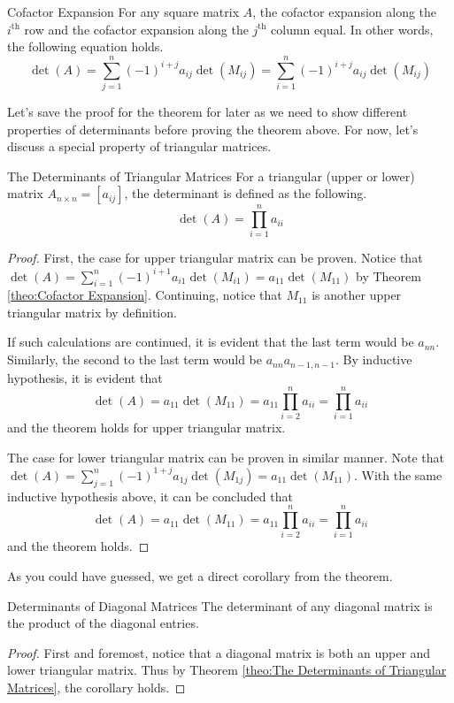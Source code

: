 \documentclass[../../main.tex]{subfiles}
\begin{document}
\begin{theorem}{}{Cofactor Expansion}
For any square matrix $A$, the cofactor expansion along the
$i^\text{th}$ row and the cofactor expansion along the $j^\text{th}$
column equal. In other words, the following equation holds.
\[
\det(A)
= \sum_{j=1}^n (-1)^{i + j} a_{ij} \det(M_{ij})
= \sum_{i=1}^n (-1)^{i + j} a_{ij} \det(M_{ij})
\]
\end{theorem}

Let's save the proof for the theorem for later as we need to show
different properties of determinants before proving the theorem
above. For now, let's discuss a special property of triangular
matrices.

\begin{theorem}{}{The Determinants of Triangular Matrices}
For a triangular (upper or lower) matrix $A_{n \times n} = [a_{ij}]$,
the determinant is defined as the following.
\[
\det(A)
= \prod_{i=1}^n a_{ii}
\]
\end{theorem}
\begin{proof}
First, the case for upper triangular matrix can be proven. Notice that
$\det(A) = \sum_{i=1}^n (-1)^{i + 1} a_{i1} \det(M_{i1}) =
a_{11} \det(M_{11})$ by Theorem \ref{theo:Cofactor Expansion}.
Continuing, notice that $M_{11}$ is another upper triangular matrix
by definition.

If such calculations are continued, it is evident that the last
term would be $a_{nn}$. Similarly, the second to the last term
would be $a_{nn} a_{n-1,n-1}$. By inductive hypothesis, it is
evident that
\[
\det(A)
= a_{11} \det(M_{11})
= a_{11} \prod_{i=2}^n a_{ii}
= \prod_{i=1}^n a_{ii}
\]
and the theorem holds for upper triangular matrix.

The case for lower triangular matrix can be proven in similar
manner. Note that $\det(A) = \sum_{j=1}^n (-1)^{1 + j} a_{1j}
\det(M_{1j}) = a_{11} \det(M_{11})$. With the same inductive
hypothesis above, it can be concluded that
\[
\det(A)
= a_{11} \det(M_{11})
= a_{11} \prod_{i=2}^n a_{ii}
= \prod_{i=1}^n a_{ii}
\]
and the theorem holds.
\end{proof}

As you could have guessed, we get a direct corollary from the
theorem.

\begin{corollary}{}{Determinants of Diagonal Matrices}
The determinant of any diagonal matrix is the product of the
diagonal entries.
\end{corollary}
\begin{proof}
First and foremost, notice that a diagonal matrix is both
an upper and lower triangular matrix. Thus by Theorem \ref{theo:The
Determinants of Triangular Matrices}, the corollary holds.
\end{proof}
\end{document}
